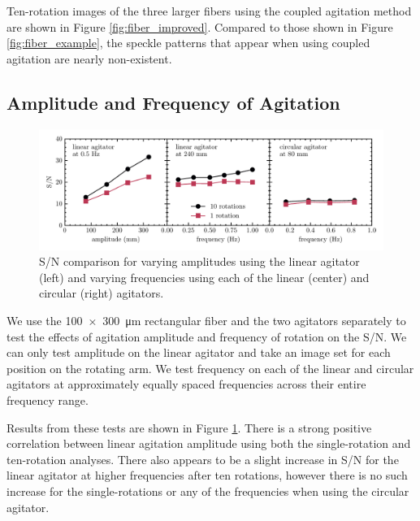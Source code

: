 \documentclass[twocolumn]{emulateapj}
\begin{document}
Ten-rotation images of the three larger fibers using the coupled agitation method are shown in Figure \ref{fig:fiber_improved}. Compared to those shown in Figure \ref{fig:fiber_example}, the speckle patterns that appear when using coupled agitation are nearly non-existent.

\subsection{Amplitude and Frequency of Agitation}
\label{subsec:amp_freq}

\begin{figure}[t]
\centering
	\includegraphics[width=\textwidth]{images/amp_freq_snr.pdf}
	\caption{S/N comparison for varying amplitudes using the linear agitator (left) and varying frequencies using each of the linear (center) and circular (right) agitators.}
\label{fig:amp_freq_snr}
\end{figure}

We use the \SI{100x300}{\micro\meter} rectangular fiber and the two agitators separately to test the effects of agitation amplitude and frequency of rotation on the S/N. We can only test amplitude on the linear agitator and take an image set for each position on the rotating arm. We test frequency on each of the linear and circular agitators at approximately equally spaced frequencies across their entire frequency range.

Results from these tests are shown in Figure \ref{fig:amp_freq_snr}. There is a strong positive correlation between linear agitation amplitude using both the single-rotation and ten-rotation analyses. There also appears to be a slight increase in S/N for the linear agitator at higher frequencies after ten rotations, however there is no such increase for the single-rotations or any of the frequencies when using the circular agitator.
\end{document}
